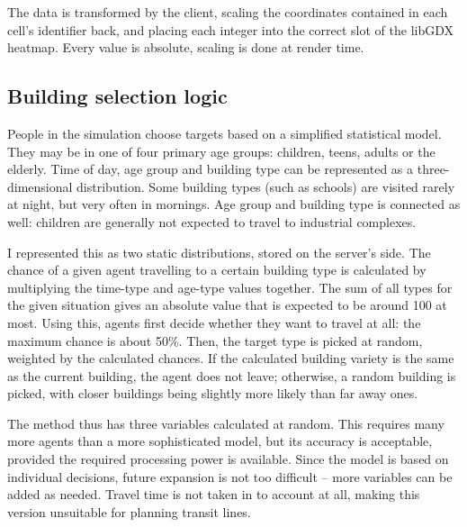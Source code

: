 The data is transformed by the client, scaling the coordinates contained in each cell's identifier back, and placing each integer into the correct slot of the libGDX heatmap. Every value is absolute, scaling is done at render time.

\subsection{Building selection logic}

People in the simulation choose targets based on a simplified statistical model. They may be in one of four primary age groups: children, teens, adults or the elderly. Time of day, age group and building type can be represented as a three-dimensional distribution. Some building types (such as schools) are visited rarely at night, but very often in mornings. Age group and building type is connected as well: children are generally not expected to travel to industrial complexes. 

I represented this as two static distributions, stored on the server's side. The chance of a given agent travelling to a certain building type is calculated by multiplying the time-type and age-type values together. The sum of all types for the given situation gives an absolute value that is expected to be around 100 at most. Using this, agents first decide whether they want to travel at all: the maximum chance is about 50\%. Then, the target type is picked at random, weighted by the calculated chances. If the calculated building variety is the same as the current building, the agent does not leave; otherwise, a random building is picked, with closer buildings being slightly more likely than far away ones.

The method thus has three variables calculated at random. This requires many more agents than a more sophisticated model, but its accuracy is acceptable, provided the required processing power is available. Since the model is based on individual decisions, future expansion is not too difficult -- more variables can be added as needed. Travel time is not taken in to account at all, making this version unsuitable for planning transit lines.